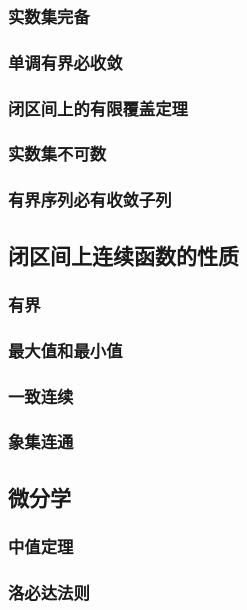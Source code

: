 \subsubsection{实数集完备}

\subsubsection{单调有界必收敛}

\subsubsection{闭区间上的有限覆盖定理}

\subsubsection{实数集不可数}

\subsubsection{有界序列必有收敛子列}

\subsection{闭区间上连续函数的性质}

\subsubsection{有界}

\subsubsection{最大值和最小值}

\subsubsection{一致连续}

\subsubsection{象集连通}

\subsection{微分学}

\subsubsection{中值定理}

\subsubsection{洛必达法则}